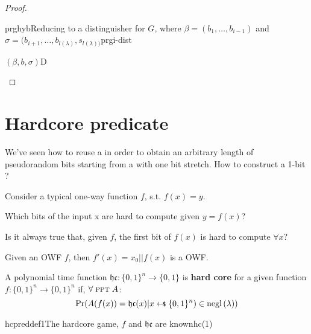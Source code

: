 \begin{proof}
\begin{cryptoredux}{prghyb}{Reducing to a distinguisher for $G$, where $\beta = (b_1, \dots, b_{i-1})$ and $\sigma = (b_{i+1}, \dots, b_{l(\lambda)}, s_{l(\lambda))}$}{prg}{i-dist}
        \seqdelay

        {$(\beta, b, \sigma)$}{D}{}
        
        \seqdelay

    
    \end{cryptoredux}

\end{proof}

\pagebreak

\section{Hardcore predicate}

We've seen how to reuse a \prg{} in order to obtain an arbitrary length of pseudorandom bits starting from a \prg{} with one bit stretch. How to construct a 1-bit \prg?

Consider a typical one-way function $f$, s.t. $f(x) = y$.
\begin{question}
    Which bits of the input x are hard to compute given $y = f(x)$?

    Is it always true that, given $f$, the first bit of $f(x)$ is hard to compute $\forall x$?
\end{question}

\begin{example}
    Given an OWF $f$, then $f'(x) = x_0 || f(x)$ is a OWF.
\end{example}


\begin{defn}
    A polynomial time function $\mathfrak{hc}:\{0,1\}^{n} \to \{0,1\} $ is \textbf{hard core} for a given function $f:\{0,1\}^{n} \to \{0,1\}^{n}$ if, $\forall\; \textsc{ppt}\; A$:
    \begin{equation*}
        \Pr(A(f(x)) = \mathfrak{hc}(x) | x \pickUAR \{0,1\}^{n}) \in \negl{\lambda)}   
    \end{equation*}
\end{defn}

\begin{cryptogame}{hcpreddef1}{The hardcore game, $f$ and $\mathfrak{hc}$ are known}{hc(1)}

\end{cryptogame}



